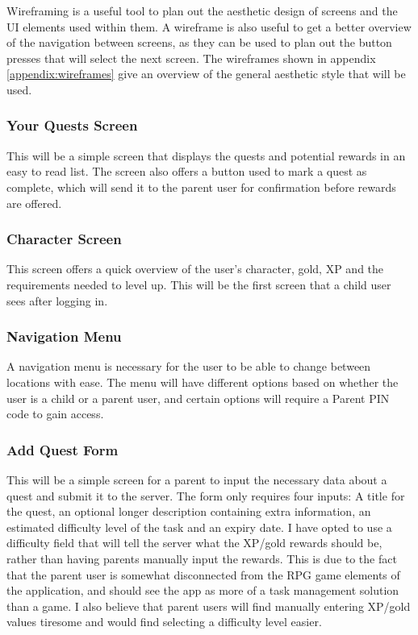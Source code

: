 Wireframing is a useful tool to plan out the aesthetic design of screens and the UI elements used within them. 
A wireframe is also useful to get a better overview of the navigation between screens, as they can be used to plan out the button presses that will select the next screen.
The wireframes shown in appendix \ref{appendix:wireframes} give an overview of the general aesthetic style that will be used.

\subsubsection{Your Quests Screen}
This will be a simple screen that displays the quests and potential rewards in an easy to read list.
The screen also offers a button used to mark a quest as complete, which will send it to the parent user for confirmation before rewards are offered.

\subsubsection{Character Screen}
This screen offers a quick overview of the user's character, gold, XP and the requirements needed to level up.
This will be the first screen that a child user sees after logging in.

\subsubsection{Navigation Menu}
A navigation menu is necessary for the user to be able to change between locations with ease.
The menu will have different options based on whether the user is a child or a parent user, and certain options will require a Parent PIN code to gain access. 

\subsubsection{Add Quest Form}
This will be a simple screen for a parent to input the necessary data about a quest and submit it to the server. 
The form only requires four inputs: A title for the quest, an optional longer description containing extra information, an estimated difficulty level of the task and an expiry date.
I have opted to use a difficulty field that will tell the server what the XP/gold rewards should be, rather than having parents manually input the rewards.
This is due to the fact that the parent user is somewhat disconnected from the RPG game elements of the application, and should see the app as more of a task management solution than a game.
I also believe that parent users will find manually entering XP/gold values tiresome and would find selecting a difficulty level easier. 


